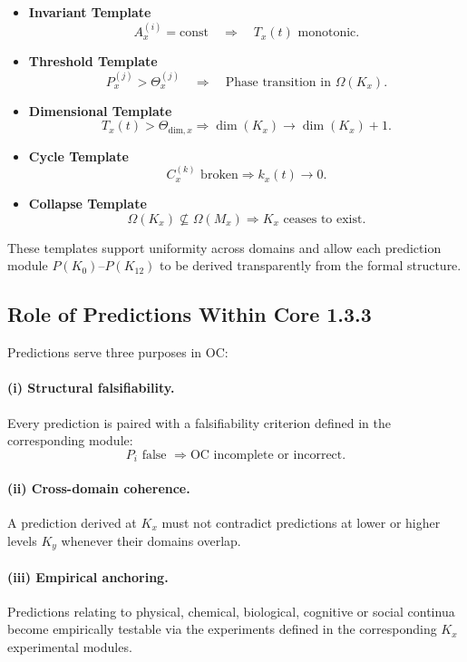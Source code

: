 \begin{itemize}
    \item \textbf{Invariant Template}
    \[
    A_x^{(i)} = \mathrm{const}
    \quad\Rightarrow\quad
    T_x(t) \text{ monotonic}.
    \]

    \item \textbf{Threshold Template}
    \[
    P_x^{(j)} > \Theta_x^{(j)}
    \quad\Rightarrow\quad
    \text{Phase transition in }\Omega(K_x).
    \]

    \item \textbf{Dimensional Template}
    \[
    T_x(t) > \Theta_{\mathrm{dim},x}
    \Rightarrow
    \dim(K_x)\to\dim(K_x)+1.
    \]

    \item \textbf{Cycle Template}
    \[
    C_x^{(k)} \text{ broken}
    \Rightarrow
    k_x(t)\to 0.
    \]

    \item \textbf{Collapse Template}
    \[
    \Omega(K_x)\not\subseteq\Omega(M_x)
    \Rightarrow
    K_x\text{ ceases to exist}.
    \]
\end{itemize}

These templates support uniformity across domains  
and allow each prediction module $P(K_0)$–$P(K_{12})$  
to be derived transparently from the formal structure.

\subsection{Role of Predictions Within Core 1.3.3}

Predictions serve three purposes in OC:

\paragraph{(i) Structural falsifiability.}
Every prediction is paired with a falsifiability criterion  
defined in the corresponding module:
\[
P_i \text{ false } \Rightarrow \text{OC incomplete or incorrect}.
\]

\paragraph{(ii) Cross-domain coherence.}
A prediction derived at $K_x$ must not contradict predictions at  
lower or higher levels $K_y$ whenever their domains overlap.

\paragraph{(iii) Empirical anchoring.}
Predictions relating to physical, chemical, biological, cognitive or  
social continua become empirically testable via the experiments  
defined in the corresponding $K_x$ experimental modules.

